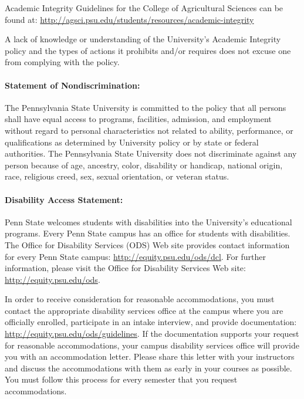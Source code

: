 \documentclass[11pt]{article}
\begin{document}
Academic Integrity Guidelines for the College of Agricultural Sciences can be found at: \url{http://agsci.psu.edu/students/resources/academic-integrity}

A lack of knowledge or understanding of the University's Academic Integrity policy and the types of actions it prohibits and/or requires does not excuse one from complying with the policy.

\paragraph{Statement of Nondiscrimination:} The Pennsylvania State University is committed to the policy that all persons shall have equal access to programs, facilities, admission, and employment without regard to personal characteristics not related to ability, performance, or qualifications as determined by University policy or by state or federal authorities. The Pennsylvania State University does not discriminate against any person because of age, ancestry, color, disability or handicap, national origin, race, religious creed, sex, sexual orientation, or veteran status.

\paragraph{Disability Access Statement:} Penn State welcomes students with disabilities into the University's educational programs. Every Penn State campus has an office for students with disabilities. The Office for Disability Services (ODS) Web site provides contact information for every Penn State campus: \url{http://equity.psu.edu/ods/dcl}. For further information, please visit the Office for Disability Services Web site: \url{http://equity.psu.edu/ods}. 

In order to receive consideration for reasonable accommodations, you must contact the appropriate disability services office at the campus where you are officially enrolled, participate in an intake interview, and provide documentation: \url{http://equity.psu.edu/ods/guidelines}. If the documentation supports your request for reasonable accommodations, your campus disability services office will provide you with an accommodation letter. Please share this letter with your instructors and discuss the accommodations with them as early in your courses as possible. You must follow this process for every semester that you request accommodations.


%
\end{document}
